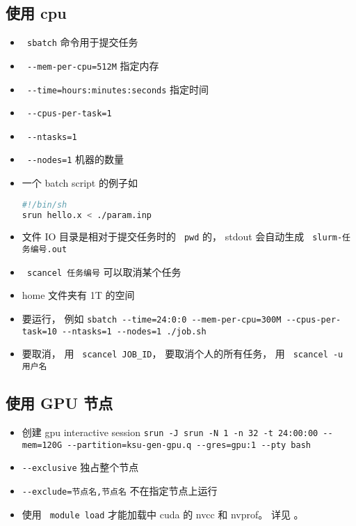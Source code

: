 
\begin{issues}
\issueDraft
\end{issues}

\subsection{使用 cpu}
\begin{itemize}
\item \verb` sbatch` 命令用于提交任务
\item \verb` --mem-per-cpu=512M` 指定内存
\item \verb` --time=hours:minutes:seconds` 指定时间
\item \verb` --cpus-per-task=1`
\item \verb` --ntasks=1`
\item \verb` --nodes=1` 机器的数量
\item 一个 batch script 的例子如
\begin{lstlisting}[language=bash]
#!/bin/sh
srun hello.x < ./param.inp
\end{lstlisting}
\item 文件 IO 目录是相对于提交任务时的 \verb` pwd` 的， stdout 会自动生成 \verb` slurm-任务编号.out`
\item \verb` scancel 任务编号` 可以取消某个任务
\item home 文件夹有 1T 的空间
\item 要运行， 例如
\verb|sbatch --time=24:0:0 --mem-per-cpu=300M --cpus-per-task=10 --ntasks=1 --nodes=1 ./job.sh|
\item 要取消， 用 \verb` scancel JOB_ID`， 要取消个人的所有任务， 用 \verb` scancel -u 用户名`
\end{itemize}

\subsection{使用 GPU 节点}
\begin{itemize}
\item 创建 gpu interactive session \verb|srun -J srun -N 1 -n 32 -t 24:00:00 --mem=120G --partition=ksu-gen-gpu.q --gres=gpu:1 --pty bash|
\item \verb`--exclusive` 独占整个节点
\item \verb`--exclude=节点名,节点名` 不在指定节点上运行
\item 使用 \verb` module load` 才能加载中 cuda 的 nvcc 和 nvprof。 详见 。
\end{itemize}

